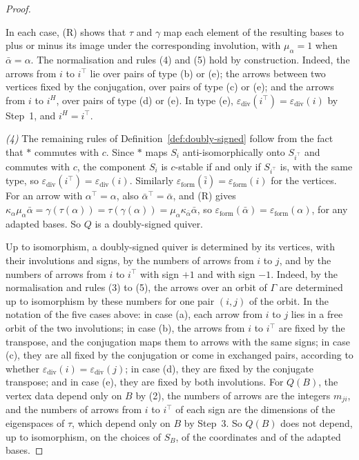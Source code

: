 \documentclass[12pt, a4paper]{report}
\theoremstyle{plain}
\theoremstyle{definition}
\theoremstyle{remark}
\theoremstyle{plain}
\newcommand{\epsilondiv}{\varepsilon_{\mathrm{div}}}
\newcommand{\epsilonform}{\varepsilon_{\mathrm{form}}}
\begin{document}
\begin{proof}
\begin{enumerate}
\end{enumerate}
In each case, (R) shows that $\tau$ and $\gamma$ map each element of the resulting bases to plus or minus its image under the corresponding involution, with $\mu_\alpha=1$ when $\bar\alpha=\alpha$. The normalisation and rules (4) and (5) hold by construction. Indeed, the arrows from $i$ to $i^{\top}$ lie over pairs of type (b) or (e); the arrows between two vertices fixed by the conjugation, over pairs of type (c) or (e); and the arrows from $i$ to $i^H$, over pairs of type (d) or (e). In type (e), $\epsilondiv(i^{\top})=\epsilondiv(i)$ by Step~1, and $i^H=i^{\top}$.

\emph{(4)} The remaining rules of Definition~\ref{def:doubly-signed} follow from the fact that $*$ commutes with $c$. Since $*$ maps $S_i$ anti-isomorphically onto $S_{i^{\top}}$ and commutes with $c$, the component $S_i$ is $c$-stable if and only if $S_{i^{\top}}$ is, with the same type, so $\epsilondiv(i^{\top})=\epsilondiv(i)$. Similarly $\epsilonform(\bar i)=\epsilonform(i)$ for the vertices. For an arrow with $\alpha^{\top}=\alpha$, also $\bar\alpha^{\top}=\bar\alpha$, and (R) gives $\kappa_\alpha\mu_\alpha\bar\alpha=\gamma(\tau(\alpha))=\tau(\gamma(\alpha))=\mu_\alpha\kappa_{\bar\alpha}\bar\alpha$, so $\epsilonform(\bar\alpha)=\epsilonform(\alpha)$, for any adapted bases. So $Q$ is a doubly-signed quiver.

Up to isomorphism, a doubly-signed quiver is determined by its vertices, with their involutions and signs, by the numbers of arrows from $i$ to $j$, and by the numbers of arrows from $i$ to $i^{\top}$ with sign $+1$ and with sign $-1$. Indeed, by the normalisation and rules (3) to (5), the arrows over an orbit of $\Gamma$ are determined up to isomorphism by these numbers for one pair $(i,j)$ of the orbit. In the notation of the five cases above: in case (a), each arrow from $i$ to $j$ lies in a free orbit of the two involutions; in case (b), the arrows from $i$ to $i^{\top}$ are fixed by the transpose, and the conjugation maps them to arrows with the same signs; in case (c), they are all fixed by the conjugation or come in exchanged pairs, according to whether $\epsilondiv(i)=\epsilondiv(j)$; in case (d), they are fixed by the conjugate transpose; and in case (e), they are fixed by both involutions. For $Q(B)$, the vertex data depend only on $B$ by (2), the numbers of arrows are the integers $m_{ji}$, and the numbers of arrows from $i$ to $i^{\top}$ of each sign are the dimensions of the eigenspaces of $\tau$, which depend only on $B$ by Step~3. So $Q(B)$ does not depend, up to isomorphism, on the choices of $S_B$, of the coordinates and of the adapted bases.


\end{proof}
\end{document}
